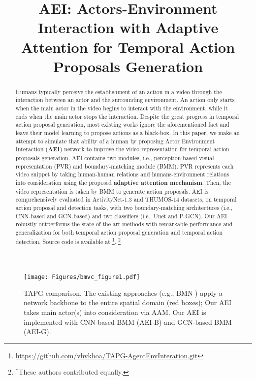 \documentclass{bmvc2k}
\title{AEI: Actors-Environment Interaction with Adaptive Attention for Temporal Action Proposals Generation}
\newcommand\blfootnote[1]{\begingroup
  \renewcommand\thefootnote{}\footnote{#1}\addtocounter{footnote}{-1}\endgroup
}
\begin{document}
\maketitle

\begin{abstract}
Humans typically perceive the establishment of an action in a video through the interaction between an actor and the surrounding environment. An action only starts when the main actor in the video begins to interact with the environment, while it ends when the main actor stops the interaction. Despite the great progress in temporal action proposal generation, most existing works ignore the aforementioned fact and leave their model learning to propose actions as a black-box. In this paper, we make an attempt to simulate that ability of a human by proposing Actor Environment Interaction (\textbf{AEI}) network to improve the video representation for temporal action proposals generation. AEI contains two modules, i.e., perception-based visual representation (PVR) and boundary-matching module (BMM). PVR represents each video snippet by taking human-human relations and humans-environment relations into consideration using the proposed \textbf{adaptive attention mechanism}. Then, the video representation is taken by BMM to generate action proposals. AEI is comprehensively evaluated in ActivityNet-1.3 and THUMOS-14 datasets, on temporal action proposal and detection tasks, with two boundary-matching architectures (i.e., CNN-based and GCN-based) and two classifiers (i.e., Unet and P-GCN). Our AEI robustly outperforms the state-of-the-art methods with remarkable performance and generalization for both temporal action proposal generation and temporal action detection. Source code is available at \footnote{\url{https://github.com/vhvkhoa/TAPG-AgentEnvInteration.git}}.
\blfootnote{$^\ast$These authors contributed equally.}


\end{abstract}



\vspace*{-\baselineskip}

\begin{figure}[t]
\centering
  \texttt{[image: Figures/bmvc\_figure1.pdf]}
  \vspace*{-0.1cm}
  \caption{TAPG comparison. The existing approaches (e.g., BMN \cite{bmn}) apply a network backbone to the entire spatial domain (red boxes); Our AEI takes main actor(s) into consideration via AAM. Our AEI is implemented with CNN-based BMM (AEI-B) and GCN-based BMM (AEI-G).}
  \vspace*{-0.4cm}
  \label{qualitative}
\end{figure}
\end{document}
